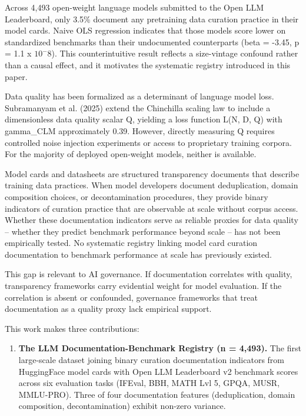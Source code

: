 
Across 4,493 open-weight language models submitted to the Open LLM Leaderboard, only 3.5\% document any pretraining data curation practice in their model cards. Naive OLS regression indicates that those models score lower on standardized benchmarks than their undocumented counterparts (beta = -3.45, p = 1.1 x $10^-8$). This counterintuitive result reflects a size-vintage confound rather than a causal effect, and it motivates the systematic registry introduced in this paper.

Data quality has been formalized as a determinant of language model loss. Subramanyam et al. (2025) extend the Chinchilla scaling law \citep{Hoffmann2022Training} to include a dimensionless data quality scalar Q, yielding a loss function L(N, D, Q) with gamma\_CLM approximately 0.39. However, directly measuring Q requires controlled noise injection experiments or access to proprietary training corpora. For the majority of deployed open-weight models, neither is available.

Model cards \citep{Mitchell2019Model} and datasheets \citep{Gebru2021Datasheets} are structured transparency documents that describe training data practices. When model developers document deduplication, domain composition choices, or decontamination procedures, they provide binary indicators of curation practice that are observable at scale without corpus access. Whether these documentation indicators serve as reliable proxies for data quality -- whether they predict benchmark performance beyond scale -- has not been empirically tested. No systematic registry linking model card curation documentation to benchmark performance at scale has previously existed.

This gap is relevant to AI governance. If documentation correlates with quality, transparency frameworks carry evidential weight for model evaluation. If the correlation is absent or confounded, governance frameworks that treat documentation as a quality proxy lack empirical support.

This work makes three contributions:

\begin{enumerate}
\item \textbf{The LLM Documentation-Benchmark Registry (n = 4,493).} The first large-scale dataset joining binary curation documentation indicators from HuggingFace model cards with Open LLM Leaderboard v2 benchmark scores across six evaluation tasks (IFEval, BBH, MATH Lvl 5, GPQA, MUSR, MMLU-PRO). Three of four documentation features (deduplication, domain composition, decontamination) exhibit non-zero variance.
\end{enumerate}

